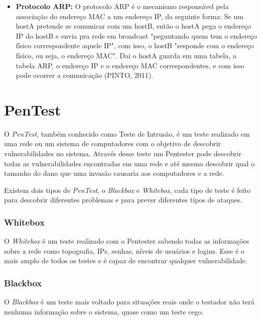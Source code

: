\begin{itemize}
\item \textbf{Protocolo ARP: } O protocolo ARP é o mecanismo responsável pela associação do endereço MAC a um endereço IP, da seguinte forma: Se um hostA pretende se comunicar com um hostB, então o hostA pega o endereço IP do hostB e envia pra rede em broadcast "peguntando quem tem o endereço físico correspondente aquele IP", com isso, o hostB "responde com o endereço físico, ou seja, o endereço MAC". Dai o hostA guarda em uma tabela, a tabela ARP, o endereço IP e o endereço MAC correspondentes, e com isso pode ocorrer a comunicação (PINTO, 2011).

\end{itemize}

\section{PenTest}

O \textit{PenTest}, também conhecido como Teste de Intrusão, é um teste realizado em uma rede ou um sistema de computadores com o objetivo de descobrir vulnerabilidades no sistema. Através desse teste um Pentester pode descobrir todas as vulnerabilidades encontradas em uma rede e até mesmo descobrir qual o tamanho do dano que uma invasão causaria aos computadores e a rede.

Existem dois tipos de \textit{PenTest}, o \textit{Blackbox} e \textit{Whitebox}, cada tipo de teste é feito para descobrir diferentes problemas e para prever diferentes tipos de ataques.

\subsubsection{Whitebox}
O \textit{Whitebox} é um teste realizado com o Pentester sabendo todas as informações sobre a rede como topografia, IPs, senhas, níveis de usuários e logins. Esse é o mais amplo de todos os testes e é capaz de encontrar qualquer vulnerabilidade.

\subsubsection{Blackbox}
O \textit{Blackbox} é um teste mais voltado para situações reais onde o testador não terá nenhuma informação sobre o sistema, quase como um teste cego.

